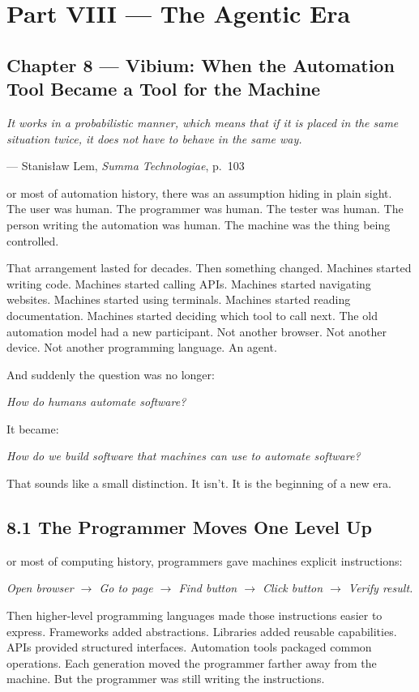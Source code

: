 \documentclass[11pt, a4paper, openany]{book}
\newcommand{\initialcap}[1]{{\fontfamily{lmss}\selectfont\huge\textbf{#1}}}
\providecommand{\epigraphlem}[2]{%
  \begin{flushright}\begin{minipage}{0.72\textwidth}\raggedleft
  \itshape #1\par\vspace{0.4em}\normalfont\small --- #2
  \end{minipage}\end{flushright}\vspace{1.2em}}
\begin{document}
\mainmatter

\chapter*{Part VIII --- The Agentic Era}

\section*{Chapter 8 --- Vibium: When the Automation Tool Became a Tool for the Machine}

\epigraphlem{It works in a probabilistic manner, which means that if it is placed in the same situation twice, it does not have to behave in the same way.}{Stanisław Lem, \textit{Summa Technologiae}, p.~103}


\noindent \initialcap{F}or most of automation history, there was an assumption hiding in plain sight. The user was human. The programmer was human. The tester was human. The person writing the automation was human. The machine was the thing being controlled. 

That arrangement lasted for decades. Then something changed. Machines started writing code. Machines started calling APIs. Machines started navigating websites. Machines started using terminals. Machines started reading documentation. Machines started deciding which tool to call next. The old automation model had a new participant. Not another browser. Not another device. Not another programming language. An agent. 

And suddenly the question was no longer:
\begin{center}
\textit{How do humans automate software?}
\end{center}
It became:
\begin{center}
\textit{How do we build software that machines can use to automate software?}
\end{center}
That sounds like a small distinction. It isn't. It is the beginning of a new era.

\section{8.1 The Programmer Moves One Level Up}
\noindent \initialcap{F}or most of computing history, programmers gave machines explicit instructions:
\begin{center}
\textit{Open browser $\rightarrow$ Go to page $\rightarrow$ Find button $\rightarrow$ Click button $\rightarrow$ Verify result.}
\end{center}
Then higher-level programming languages made those instructions easier to express. Frameworks added abstractions. Libraries added reusable capabilities. APIs provided structured interfaces. Automation tools packaged common operations. Each generation moved the programmer farther away from the machine. But the programmer was still writing the instructions.
\end{document}
